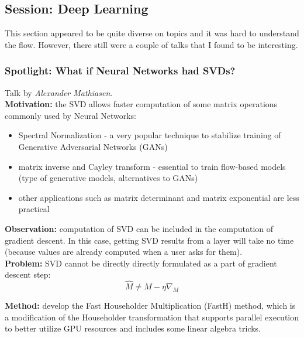 \subsection{Session: Deep Learning}

This section appeared to be quite diverse on topics and it was hard to understand the flow. However, there still were a couple of talks that I found to be interesting.

\spacerule
\subsubsection{Spotlight: What if Neural Networks had SVDs? \cite{mathiasen2020neural}}

Talk by \textit{Alexander Mathiasen}. \\

{\bf Motivation:} the SVD allows faster computation of some matrix operations commonly used by Neural Networks: 
\begin{itemize}
  \item Spectral Normalization \cite{MiyatoKKY18} - a very popular technique to stabilize training of Generative Adversarial Networks (GANs)
  \item matrix inverse and Cayley transform - essential to train flow-based models (type of generative models, alternatives to GANs) \cite{kingma2018glow}
  \item other applications such as matrix determinant and matrix exponential are less practical
\end{itemize} 

{\bf Observation:} computation of SVD can be included in the computation of gradient descent. 
In this case, getting SVD results from a layer will take no time (because values are already computed when a user asks for them). \\

{\bf Problem:} SVD cannot be directly directly formulated as a part of gradient descent step: 
\begin{equation} 
  \hat{M} \neq M - \eta\nabla_{M}
\end{equation} 

{\bf Method:} develop the Fast Householder Multiplication (FastH) method, which is a modification of the Householder transformation that supports parallel execution to better utilize GPU resources and includes some linear algebra tricks. \\

